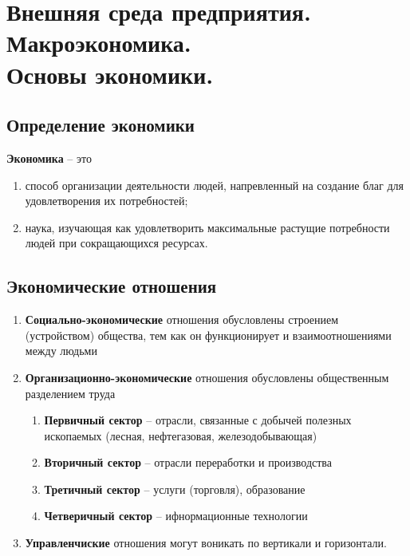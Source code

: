 \section{Внешняя среда предприятия. Макроэкономика.\\Основы экономики.}

\subsection{Определение экономики}

\textbf{Экономика} -- это

\begin{enumerate}
    \item способ организации деятельности людей, напревленный на создание благ для удовлетворения их потребностей;
    \item наука, изучающая как удовлетворить максимальные растущие потребности людей при сокращающихся ресурсах.
\end{enumerate}

\subsection{Экономические отношения}

\begin{enumerate}
    \item \textbf{Социально-экономические} отношения обусловлены строением (устройством) общества, тем как он функционирует и взаимоотношениями между людьми
    \item \textbf{Организационно-экономические} отношения обусловлены общественным разделением труда

        \begin{enumerate}
            \item \textbf{Первичный сектор} -- отрасли, связанные с добычей полезных ископаемых (лесная, нефтегазовая, железодобывающая)
            \item \textbf{Вторичный сектор} -- отрасли переработки и производства
            \item \textbf{Третичный сектор} -- услуги (торговля), образование
            \item \textbf{Четверичный сектор} -- ифнормационные технологии
        \end{enumerate}

    \item \textbf{Управленчиские} отношения могут воникать по вертикали и горизонтали.
\end{enumerate}

